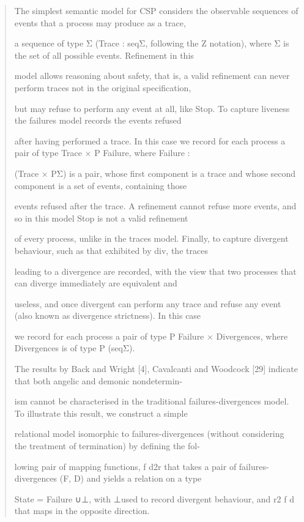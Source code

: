 \documentclass[11pt]{article}
\begin{document}
\begin{quote}\small\raggedright
The simplest semantic model for CSP considers the observable sequences of events that a process may produce as a trace,
\par
a sequence of type Σ (Trace : seqΣ, following the Z notation), where Σ is the set of all possible events. Refinement in this
\par
model allows reasoning about safety, that is, a valid refinement can never perform traces not in the original specification,
\par
but may refuse to perform any event at all, like Stop. To capture liveness the failures model records the events refused
\par
after having performed a trace. In this case we record for each process a pair of type Trace × P Failure, where Failure :
\par
(Trace × PΣ) is a pair, whose first component is a trace and whose second component is a set of events, containing those
\par
events refused after the trace. A refinement cannot refuse more events, and so in this model Stop is not a valid refinement
\par
of every process, unlike in the traces model. Finally, to capture divergent behaviour, such as that exhibited by div, the traces
\par
leading to a divergence are recorded, with the view that two processes that can diverge immediately are equivalent and
\par
useless, and once divergent can perform any trace and refuse any event (also known as divergence strictness). In this case
\par
we record for each process a pair of type P Failure × Divergences, where Divergences is of type P (seqΣ).
\par
The results by Back and Wright [4], Cavalcanti and Woodcock [29] indicate that both angelic and demonic nondetermin-
\par
ism cannot be characterised in the traditional failures-divergences model. To illustrate this result, we construct a simple
\par
relational model isomorphic to failures-divergences (without considering the treatment of termination) by defining the fol-
\par
lowing pair of mapping functions, f d2r that takes a pair of failures-divergences (F, D) and yields a relation on a type
\par
State = Failure ∪⊥, with ⊥used to record divergent behaviour, and r2 f d that maps in the opposite direction.
\end{quote}
\end{document}
